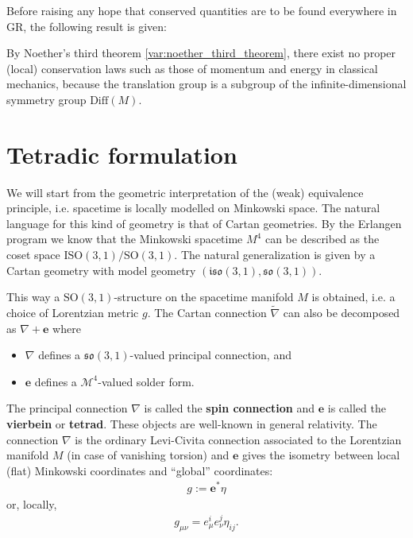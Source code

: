     Before raising any hope that conserved quantities are to be found everywhere in GR, the following result is given:
    \begin{property}
        By Noether's third theorem \ref{var:noether_third_theorem}, there exist no proper (local) conservation laws such as those of momentum and energy in classical mechanics, because the translation group is a subgroup of the infinite-dimensional symmetry group $\mathrm{Diff}(M)$.
    \end{property}

\section{Tetradic formulation}

    We will start from the geometric interpretation of the (weak) equivalence principle, i.e. spacetime is locally modelled on Minkowski space. The natural language for this kind of geometry is that of Cartan geometries. By the Erlangen program we know that the Minkowski spacetime $M^4$ can be described as the coset space $\mathrm{ISO}(3,1)/\mathrm{SO}(3,1)$. The natural generalization is given by a Cartan geometry with model geometry $(\mathfrak{iso}(3,1),\mathfrak{so}(3,1))$.

    \begin{property}
        This way a $\mathrm{SO}(3,1)$-structure on the spacetime manifold $M$ is obtained, i.e. a choice of Lorentzian metric $g$. The Cartan connection $\widetilde{\nabla}$ can also be decomposed as $\nabla+\mathbf{e}$ where
        \begin{itemize}
            \item $\nabla$ defines a $\mathfrak{so}(3,1)$-valued principal connection, and
            \item $\mathbf{e}$ defines a $\mathcal{M}^4$-valued solder form.
        \end{itemize}
        The principal connection $\nabla$ is called the \textbf{spin connection} and $\mathbf{e}$ is called the \textbf{vierbein} or \textbf{tetrad}. These objects are well-known in general relativity. The connection $\nabla$ is the ordinary Levi-Civita connection associated to the Lorentzian manifold $M$ (in case of vanishing torsion) and $\mathbf{e}$ gives the isometry between local (flat) Minkowski coordinates and ``global'' coordinates:
        \begin{gather}
            g := \mathbf{e}^*\eta
        \end{gather}
        or, locally,
        \begin{gather}
            g_{\mu\nu} = e^i_\mu e^j_\nu\eta_{ij}.
        \end{gather}
    \end{property}

